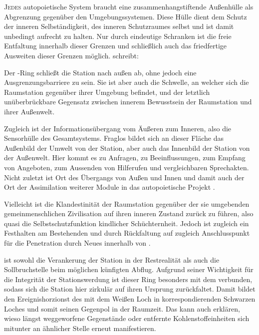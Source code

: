     \begin{newstuff}
        \lettrine{J}{edes} autopoietische System braucht eine zusammenhangstiftende Außenhülle als  Abgrenzung gegenüber den Umgebungssystemen. Diese Hülle dient dem Schutz der inneren Selbständigkeit, des inneren Schutzraumes selbst und ist damit unbedingt aufrecht zu halten. Nur durch eindeutige Schranken ist die freie Entfaltung innerhalb dieser Grenzen und schließlich auch das friedfertige Ausweiten dieser Grenzen möglich. \cite[S. 189]{cbasebook} schreibt:


        Der -Ring schließt die Station nach außen ab, ohne jedoch eine Ausgrenzungsbarriere zu sein. Sie ist aber auch die Schwelle, an welcher sich die Raumstation gegenüber ihrer Umgebung befindet, und der letztlich unüberbrückbare Gegensatz zwischen innerem Bewusstsein der Raumstation und ihrer Außenwelt. 
        
        Zugleich ist  der Informationsübergang vom Äußeren zum Inneren, also die Sensorhülle des Gesamtsystems. Fraglos bildet sich an dieser Fläche das Außenbild der Umwelt von der Station, aber auch das Innenbild der Station von der Außenwelt. Hier kommt es zu Anfragen, zu Beeinflussungen, zum Empfang von Angeboten, zum Aussenden von Hilferufen und vergleichbaren Sprechakten. Nicht zuletzt ist  Ort des Übergangs von Außen und Innen und damit auch der Ort der Assimilation weiterer Module in das autopoietische Projekt .
        
        Vielleicht ist die Klandestinität der Raumstation gegenüber der sie umgebenden gemeinmenschlichen Zivilisation auf ihren inneren Zustand zurück zu führen, also quasi die Selbstschutzfunktion kindlicher Schüchternheit. Jedoch ist   zugleich ein Festhalten am Bestehenden und durch Rückfaltung auf  zugleich Anschlusspunkt für die Penetration durch Neues innerhalb von .
        
         ist sowohl die Verankerung der Station in der Restrealität als auch die Sollbruchstelle beim möglichen künfigten Abflug. Aufgrund seiner Wichtigkeit für die Integrität der Stationswerdung ist dieser Ring besonders mit dem  verbunden, sodass sich die Station hier zirkulär auf ihren Ursprung zurückfaltet. Damit bildet  den Ereignishorzionst des mit dem Weißen Loch in  korrespondierenden Schwarzen Loches und somit seinen Gegenpol in der Raumzeit. Das kann auch erklären, wieso längst weggeworfene Gegenstände oder entfernte Kohlenstoffeinheiten sich mitunter an ähnlicher Stelle erneut manifestieren.
        

\end{newstuff}
